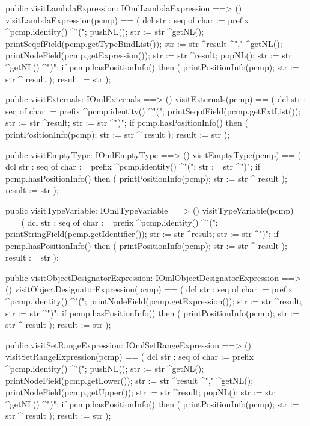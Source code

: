 \begin{vdm_al}
  public visitLambdaExpression: IOmlLambdaExpression ==> ()
  visitLambdaExpression(pcmp) ==
    ( dcl str : seq of char := prefix ^pcmp.identity() ^"(";
      pushNL();
      str := str ^getNL();
      printSeqofField(pcmp.getTypeBindList());
      str := str ^result ^"," ^getNL();
      printNodeField(pcmp.getExpression());
      str := str ^result;
      popNL();
      str := str ^getNL() ^")";
      if pcmp.hasPositionInfo()
      then ( printPositionInfo(pcmp);
             str := str ^ result );
      result := str );

  public visitExternals: IOmlExternals ==> ()
  visitExternals(pcmp) ==
    ( dcl str : seq of char := prefix ^pcmp.identity() ^"(";
      printSeqofField(pcmp.getExtList());
      str := str ^result;
      str := str ^")";
      if pcmp.hasPositionInfo()
      then ( printPositionInfo(pcmp);
             str := str ^ result );
      result := str );

  public visitEmptyType: IOmlEmptyType ==> ()
  visitEmptyType(pcmp) ==
    ( dcl str : seq of char := prefix ^pcmp.identity() ^"(";
      str := str ^")";
      if pcmp.hasPositionInfo()
      then ( printPositionInfo(pcmp);
             str := str ^ result );
      result := str );

  public visitTypeVariable: IOmlTypeVariable ==> ()
  visitTypeVariable(pcmp) ==
    ( dcl str : seq of char := prefix ^pcmp.identity() ^"(";
      printStringField(pcmp.getIdentifier());
      str := str ^result;
      str := str ^")";
      if pcmp.hasPositionInfo()
      then ( printPositionInfo(pcmp);
             str := str ^ result );
      result := str );

  public visitObjectDesignatorExpression: IOmlObjectDesignatorExpression ==> ()
  visitObjectDesignatorExpression(pcmp) ==
    ( dcl str : seq of char := prefix ^pcmp.identity() ^"(";
      printNodeField(pcmp.getExpression());
      str := str ^result;
      str := str ^")";
      if pcmp.hasPositionInfo()
      then ( printPositionInfo(pcmp);
             str := str ^ result );
      result := str );

  public visitSetRangeExpression: IOmlSetRangeExpression ==> ()
  visitSetRangeExpression(pcmp) ==
    ( dcl str : seq of char := prefix ^pcmp.identity() ^"(";
      pushNL();
      str := str ^getNL();
      printNodeField(pcmp.getLower());
      str := str ^result ^"," ^getNL();
      printNodeField(pcmp.getUpper());
      str := str ^result;
      popNL();
      str := str ^getNL() ^")";
      if pcmp.hasPositionInfo()
      then ( printPositionInfo(pcmp);
             str := str ^ result );
      result := str );


\end{vdm_al}
